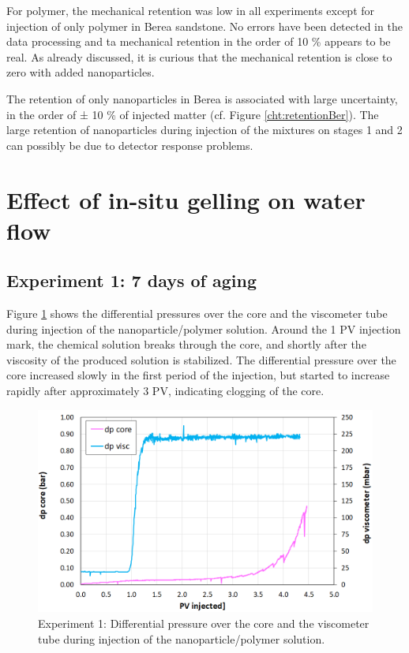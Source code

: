 For polymer, the mechanical retention was low in all experiments except for injection of only polymer in Berea sandstone. No errors have been detected in the data processing and ta mechanical retention in the order of 10 \% appears to be real. As already discussed, it is curious that the mechanical retention is close to zero with added nanoparticles. 

The retention of only nanoparticles in Berea is associated with large uncertainty, in the order of ± 10 \% of injected matter (cf. Figure \ref{cht:retentionBer}). The large retention of nanoparticles during injection of the mixtures on stages 1 and 2 can possibly be due to detector response problems. 


\section{ Effect of in-situ gelling on water flow}
\subsection{Experiment 1: 7 days of aging}
Figure \ref{cht:gelexp1_1} shows the differential pressures over the core and the viscometer tube during injection of the nanoparticle/polymer solution. Around the 1 PV injection mark, the chemical solution breaks through the core, and shortly after the viscosity of the produced solution is stabilized. The differential pressure over the core increased slowly in the first period of the injection, but started to increase rapidly after approximately 3 PV, indicating clogging of the core.

\begin{figure}[h!]
    \centering
    \includegraphics[width=\textwidth]{img/cht/gelexp1_1.png}
    \caption{Experiment 1: Differential pressure over the core and the viscometer tube during injection of the nanoparticle/polymer solution.}
    \label{cht:gelexp1_1} %
\end{figure}

